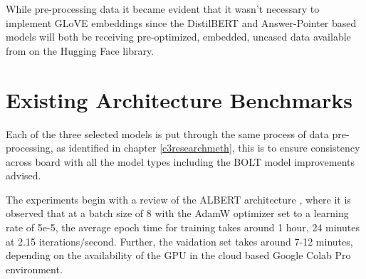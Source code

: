 \documentclass[a4paper,12pt]{report}
\begin{document}
		While pre-processing data it became evident that it wasn't necessary to implement GLoVE embeddings since the DistilBERT and Answer-Pointer based models will both be receiving pre-optimized, embedded, uncased data available from on the Hugging Face library.

     \section{Existing Architecture Benchmarks}\label{c51}

     	Each of the three selected models is put through the same process of data pre-processing, as identified in chapter \ref{c3researchmeth}, this is to ensure consistency across board with all the model types including the BOLT model improvements advised.

    	The experiments begin with a review of the ALBERT architecture \citep{albert}, where it is observed that at a batch size of 8 with the AdamW optimizer set to a learning rate of 5e-5, the average epoch time for training takes around 1 hour, 24 minutes at 2.15 iterations/second. Further, the vaidation set takes around 7-12 minutes, depending on the availability of the GPU in the cloud based Google Colab Pro environment.
\end{document}
